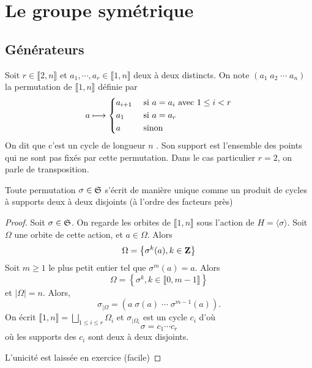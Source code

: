 \section{Le groupe symétrique}

\subsection{Générateurs}

\begin{dfn}
    Soit $r \in \llbracket 2, n \rrbracket  $ et $a_1, \cdots , a_r \in \llbracket 1, n \rrbracket $ deux à deux distincts. On note $(a_1\;a_2\;\cdots \; a_n)$ la permutation de $\llbracket 1, n \rrbracket $ définie par \[
    a \longmapsto \begin{dcases}
        a_{i+1} & \text{ si } a=a_i \text{ avec } 1\leq i< r\\
        a_1 & \text{ si } a=a_r \\
        a & \text{ sinon }
    \end{dcases}
    \] 
    On dit que c'est un cycle de longueur $n$ . Son support  est l'ensemble des points qui ne sont pas fixés par cette permutation. Dans le cas particulier  $r=2$, on parle de transposition.
\end{dfn}

\begin{thm}
    Toute permutation $\sigma \in  \mathfrak S$ s'écrit de manière unique comme un produit de cycles à supports deux à deux disjoints (à l'ordre des facteurs près)
\end{thm}

\begin{proof}
Soit $\sigma \in  \mathfrak S$. On regarde les orbites de $\llbracket 1, n \rrbracket $ sous l'action de $H=\langle \sigma\rangle$. Soit  $\Omega$ une orbite de cette action, et  $a \in  \Omega$. Alors \[
    \Omega = \left\{ \sigma^k(a), k \in  \mathbf Z \right\} 
\] 
Soit $m\geq 1$ le plus petit entier tel que $\sigma^m(a)=a$. Alors  \[\Omega = \left\{ \sigma^k, k \in  \llbracket 0,m-1 \rrbracket  \right\} \] et $|\Omega|=n$. Alors, \[\sigma_{|\Omega}=(a\;\sigma(a)\;\cdots \; \sigma^{m-1}(a)).\] On écrit $\llbracket 1, n \rrbracket =\bigsqcup_{1\leq i\leq r}\Omega_i$ et $\sigma_{|\Omega_i}$ est un cycle $c_i$ d'où \[\sigma=c_1\cdots c_r\] où les supports des $c_i$ sont deux à deux disjoints.

L'unicité est laissée en exercice (facile)
\end{proof}

